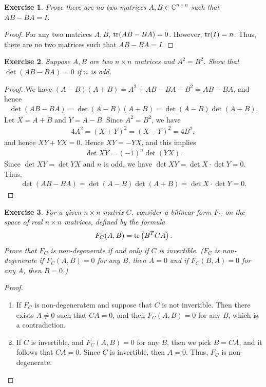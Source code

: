 \documentclass[11pt]{book}
\newtheorem{exercise}{Exercise}[section]
\theoremstyle{definition}
\numberwithin{equation}{chapter}
\begin{document}
\medskip

\begin{exercise}
Prove there are no two matrices $A, B \in \mathbb{C}^{n \times n}$ such that $AB - BA = I${\rm \cite{19}}. 
\end{exercise}
\begin{proof}
For any two matrices $A, B$, ${\rm tr}(AB - BA) = 0$\cite{20}. However, ${\rm tr} (I) = n$. Thus, there are no two matrices such that $AB - BA = I$.
\end{proof}

\medskip

\begin{exercise}
Suppose $A,B$ are two $n \times n$ matrices and $A^2 = B^2$. Show that $\det (AB - BA) = 0$ if $n$ is odd.
\end{exercise}
\begin{proof}
We have $(A - B)(A + B) = A^2 + AB - BA - B^2 = AB - BA$, and hence
\begin{align*}
    \det (AB - BA) = \det (A - B)(A + B) = \det (A - B) \det (A + B).
\end{align*}
Let $X = A + B$ and $Y = A - B$. Since $A^2 = B^2$, we have
\begin{align*}
    4A^2 = (X + Y)^2 = (X - Y)^2 = 4B^2,
\end{align*}
and hence $XY + YX = 0$. Hence $XY = -YX$, and this implies
\begin{align*}
    \det XY = (-1)^n \det (YX).
\end{align*}
Since $\det XY = \det YX$ and $n$ is odd, we have $\det XY = \det X \cdot \det Y = 0$. Thus,
\begin{align*}
    \det (AB - BA) = \det (A - B) \det (A + B) = \det X \cdot \det Y = 0.
\end{align*}
\end{proof}

\medskip

\begin{exercise} 
For a given $n \times n$ matrix $C$, consider a bilinear form $F_C$ on the space of real $n \times n$ matrices, defined by the formula 
\begin{align*}
    F_C(A, B) = {\rm tr} \left(B^T C A\right).
\end{align*}
Prove that $F_C$ is non-degenerate if and only if $C$ is invertible. ($F_C$ is non-degenerate if $F_C(A,B) = 0$ for any $B$, then $A = 0$ and if $F_C(B,A) = 0$ for any $A$, then $B = 0$.)
\end{exercise}
\begin{proof}
~\begin{enumerate}[label=(\alph*)]
    \item If $F_C$ is non-degeneratem and suppose that $C$ is not invertible. Then there exists $A \neq 0$ such that $CA = 0$, and then $F_C(A,B) = 0$ for any $B$, which is a contradiction.
    
    \item If $C$ is invertible, and $F_C(A, B) = 0$ for any $B$, then we pick $B = CA$, and it follows that $CA = 0$. Since $C$ is invertible, then $A = 0$. Thus, $F_C$ is non-degenerate.
\end{enumerate}
\end{proof}
\end{document}
